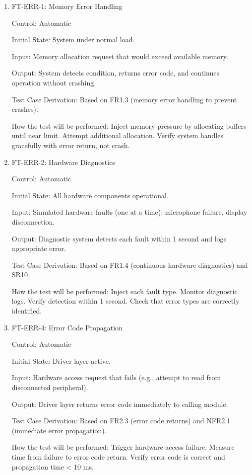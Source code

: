 \documentclass[12pt, titlepage]{article}
\begin{document}
\begin{enumerate}

\item{FT-ERR-1: Memory Error Handling\\}

Control: Automatic
					
Initial State: System under normal load.
					
Input: Memory allocation request that would exceed available memory.
					
Output: System detects condition, returns error code, and continues operation
without crashing.

Test Case Derivation: Based on FR1.3 (memory error handling to prevent crashes).

How the test will be performed: Inject memory pressure by allocating buffers until
near limit. Attempt additional allocation. Verify system handles gracefully with
error return, not crash.

\item{FT-ERR-2: Hardware Diagnostics\\}

Control: Automatic
					
Initial State: All hardware components operational.
					
Input: Simulated hardware faults (one at a time): microphone failure, display
disconnection.
					
Output: Diagnostic system detects each fault within 1 second and logs
appropriate error.

Test Case Derivation: Based on FR1.4 (continuous hardware diagnostics) and SR10.

How the test will be performed: Inject each fault type. Monitor diagnostic logs.
Verify detection within 1 second. Check that error types are correctly
identified.

\item{FT-ERR-4: Error Code Propagation\\}

Control: Automatic
					
Initial State: Driver layer active.
					
Input: Hardware access request that fails (e.g., attempt to read from
disconnected peripheral).
					
Output: Driver layer returns error code immediately to calling module.

Test Case Derivation: Based on FR2.3 (error code returns) and NFR2.1 (immediate
error propagation).

How the test will be performed: Trigger hardware access failure. Measure time from
failure to error code return. Verify error code is correct and propagation time
< 10 ms.

\end{enumerate}
\end{document}
